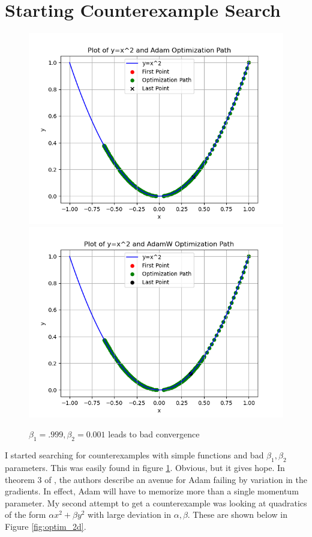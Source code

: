 \documentclass[landscape,twocolumn]{article}
\newcommand{\1}{\mathds{1}}
\begin{document}
\section*{Starting Counterexample Search}\vspace{-.4cm}
\begin{figure}[H]
    \centering 
    \includegraphics[width=.47\linewidth]{../Notebooks/adam_bad_initial.png}
    \includegraphics[width=.47\linewidth]{../Notebooks/adamw_bad_initial.png}
    \caption{\(\beta_1=.999,\beta_2 = 0.001\) leads to bad convergence}
    \label{fig:first_counterexamples}
\end{figure}
I started searching for counterexamples with simple functions and bad \(\beta_1,\beta_2\) parameters. This was easily found in figure \ref{fig:first_counterexamples}. 
Obvious, but it gives hope. In theorem 3 of \cite{reddi2019convergence}, the authors describe an avenue for Adam failing by variation in the gradients. In effect, Adam will have to memorize more than a single momentum parameter. 
My second attempt to get a counterexample was looking at quadratics of the form \(\alpha x^2 + \beta y^2\) with large deviation in \(\alpha,\beta\). These are shown below in Figure \ref{fig:optim_2d}. 
\end{document}
